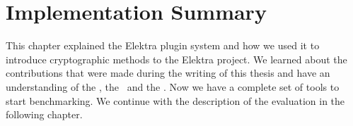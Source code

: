 \section{Implementation Summary}

This chapter explained the Elektra plugin system and how we used it to introduce cryptographic methods to the Elektra project.
We learned about the contributions that were made during the writing of this thesis and have an understanding of the \crypto, the \fcrypt ~and the \base.
Now we have a complete set of tools to start benchmarking.
We continue with the description of the evaluation in the following chapter.
